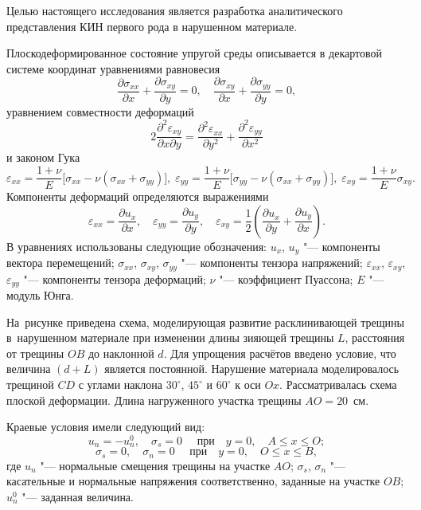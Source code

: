Целью настоящего исследования является разработка аналитического представления КИН первого рода в нарушенном материале.

\smallskip

Плоскодеформированное состояние упругой среды описывается в декартовой системе координат уравнениями равновесия
$$\frac{\partial \sigma _{xx}}{\partial x}+\frac{\partial \sigma _{xy}}{\partial y}=0, \quad  \frac{\partial \sigma _{xy}}{\partial x}+\frac{\partial \sigma _{yy}}{\partial y}=0,$$
уравнением совместности деформаций
$$2\frac{\partial^{2}\varepsilon_{xy}}{\partial x\partial y}=\frac{\partial^{2}\varepsilon_{xx}}{\partial y^{2}}+\frac{\partial^{2}\varepsilon_{yy}}{\partial x^{2}}$$
и законом Гука
$$\varepsilon_{xx}=\frac{1+\nu}{E}\bigl[\sigma_{xx}-\nu(\sigma_{xx}+\sigma_{yy})\bigr],\; 
\varepsilon_{yy}=\frac{1+\nu}{E}\bigl[\sigma_{yy}-\nu(\sigma_{xx}+\sigma_{yy})\bigr],\; 
\varepsilon_{xy}=\frac{1+\nu}{E}\sigma_{xy}.$$
Компоненты деформаций определяются выражениями
$$\varepsilon_{xx}=\frac{\partial u_{x}}{\partial x},\quad  \varepsilon_{yy}=\frac{\partial u_{y}}{\partial y}, \quad \varepsilon_{xy}=\frac{1}{2}\left(\frac{\partial u_{x}}{\partial y}+\frac{\partial u_{y}}{\partial x}\right).
$$
В уравнениях использованы следующие обозначения: $u_{x}$, $u_{y}$ "--- компоненты вектора перемещений; $\sigma_{xx}$, $\sigma_{xy}$, $\sigma_{yy}$ "--- компоненты тензора напряжений; $\varepsilon_{xx}$, $\varepsilon_{xy}$, $\varepsilon_{yy}$ "--- компоненты тензора деформаций; $\nu$ "--- коэффициент Пуассона; $E$ "--- модуль Юнга.

На~рисунке приведена схема, моделирующая развитие расклинивающей трещины в~нарушенном материале при изменении длины зияющей трещины $L$, расстояния от трещины $OB$ до наклонной $d$. 
Для упрощения расчётов введено условие, что величина $(d+L)$ является постоянной. 
Нарушение материала моделировалось трещиной $CD$ с углами наклона $30^{\circ}$, $45^{\circ}$ и $60^{\circ}$ к оси $Ox$. 
Рассматривалась схема плоской деформации. 
Длина нагруженного участка трещины $AO=20$~см.

Краевые условия имели следующий вид:
$$u_{n}=-u^{0}_{n},\quad  \sigma_{s}=0 \quad  \mbox{ при~~ } y=0,\quad A\leq x\leq O;$$
$$\sigma_{s}=0,\quad  \sigma_{n}=0 \quad  \mbox{ при ~~} y=0,\quad  O\leq x\leq B,$$
где $u_n$ "--- нормальные смещения трещины на участке $AO$; $\sigma_s$, $\sigma_n$ "--- касательные и нормальные напряжения соответственно, заданные на участке $OB$; $u^{0}_{n}$ "--- заданная величина.

